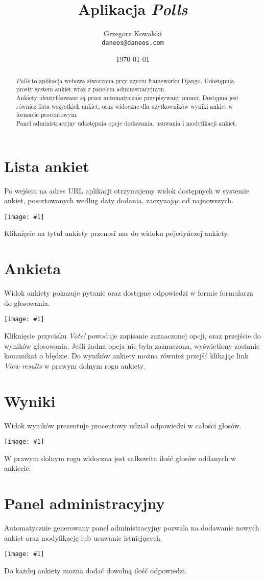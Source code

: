 \documentclass[12pt,a4paper]{article}
\title{Aplikacja \emph{Polls}}
\author{Grzegorz Kowalski\\\texttt{daneos@daneos.com}}
\date{\today}
\newcommand{\screenshot}[1]{\\\begin{minipage}[c]{\textwidth}\hspace{0em}\texttt{[image: \#1]}\end{minipage}\vspace{0em}}
\begin{document}
\maketitle

\begin{abstract}
\emph{Polls} to aplikacja webowa stworzona przy użyciu frameworku Django. Udostępnia prosty system ankiet wraz z panelem administracyjnym.\\
Ankiety identyfikowane są przez automatycznie przypisywany numer. Dostępna jest również lista wszystkich ankiet, oraz widoczne dla użytkowników wyniki ankiet w formacie procentowym.\\
Panel administracyjny udostępnia opcje dodawania, usuwania i modyfikacji ankiet.
\end{abstract}

\section{Lista ankiet}
Po wejściu na adres URL aplikacji otrzymujemy widok dostępnych w systemie ankiet, posortowanych według daty dodania, zaczynając od najnowszych.
\screenshot{poll_list.png}
Kliknięcie na tytuł ankiety przenosi nas do widoku pojedyńczej ankiety.

\newpage
\section{Ankieta}
Widok ankiety pokazuje pytanie oraz dostępne odpowiedzi w formie formularza do głosowania.
\screenshot{poll.png}
Kliknięcie przycisku \emph{Vote!} powoduje zapisanie zaznaczonej opcji, oraz przejście do wyników głosowania. Jeśli żadna opcja nie była zaznaczona, wyświetlony zostanie komunikat o błędzie. Do wyników ankiety można również przejść klikając link \emph{View results} w prawym dolnym rogu ankiety.

\section{Wyniki}
Widok wyników prezentuje procentowy udział odpowiedzi w całości głosów.
\screenshot{poll_results.png}
W prawym dolnym rogu widoczna jest całkowita ilość głosów oddanych w ankiecie.

\newpage
\section{Panel administracyjny}
Automatycznie generowany panel administracyjny pozwala na dodawanie nowych ankiet oraz modyfikację lub usuwanie istniejących.
\screenshot{admin.png}
Do każdej ankiety można dodać dowolną ilość odpowiedzi.
\end{document}
